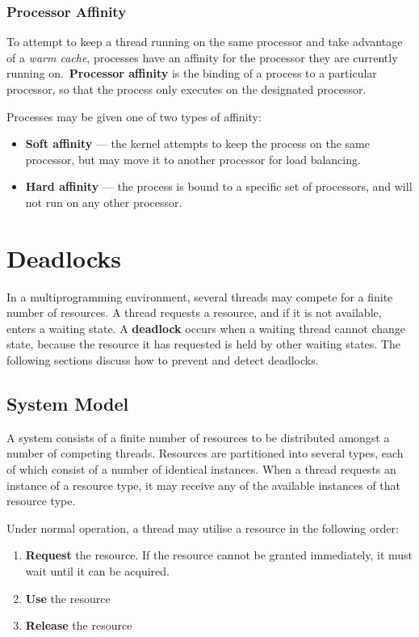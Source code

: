\documentclass{article}
\begin{document}
\subsubsection{Processor Affinity}
To attempt to keep a thread running on the same processor and take
advantage of a \textit{warm cache}, processes have an affinity for the
processor they are currently running on.\ \textbf{Processor affinity}
is the binding of a process to a particular processor, so that the
process only executes on the designated processor.

Processes may be given one of two types of affinity:
\begin{itemize}
    \item \textbf{Soft affinity} --- the kernel attempts to keep the
          process on the same processor, but may move it to another
          processor for load balancing.
    \item \textbf{Hard affinity} --- the process is bound to a specific
          set of processors, and will not run on any other processor.
\end{itemize}
\section{Deadlocks}
In a multiprogramming environment, several threads may compete for a
finite number of resources. A thread requests a resource, and if it is
not available, enters a waiting state. A \textbf{deadlock} occurs when
a waiting thread cannot change state, because the resource it has
requested is held by other waiting states. The following sections
discuss how to prevent and detect deadlocks.
\subsection{System Model}
A system consists of a finite number of resources to be distributed
amongst a number of competing threads. Resources are partitioned into
several types, each of which consist of a number of identical
instances. When a thread requests an instance of a resource type, it
may receive any of the available instances of that resource type.

Under normal operation, a thread may utilise a resource in the
following order:
\begin{enumerate}
    \item \textbf{Request} the resource. If the resource cannot be
          granted immediately, it must wait until it can be acquired.
    \item \textbf{Use} the resource
    \item \textbf{Release} the resource
\end{enumerate}
\end{document}
